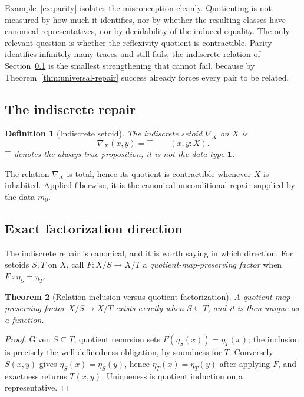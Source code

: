 \documentclass[10pt,reqno]{amsart}
\newtheorem{theorem}{Theorem}[section]
\newtheorem{definition}[theorem]{Definition}
\newcommand{\Unit}{\mathbf 1}
\begin{document}
Example~\ref{ex:parity} isolates the misconception cleanly.  Quotienting is not
measured by how much it identifies, nor by whether the resulting classes have
canonical representatives, nor by decidability of the induced equality.  The
only relevant question is whether the reflexivity quotient is contractible.
Parity identifies infinitely many traces and still fails; the indiscrete
relation of Section~\ref{subsec:indiscrete} is the smallest strengthening that
cannot fail, because by Theorem~\ref{thm:universal-repair} success already
forces every pair to be related.

\subsection{The indiscrete repair}
\label{subsec:indiscrete}

\begin{definition}[Indiscrete setoid]
\label{def:indiscrete}
The indiscrete setoid \(\nabla_X\) on \(X\) is
\[
                        \nabla_X(x,y)=\top
                        \qquad(x,y:X).
\tag{5.9}\label{eq:indiscrete}
\]
\(\top\) denotes the always-true proposition; it is not the data type \(\Unit\).
\end{definition}

The relation \(\nabla_X\) is total, hence its quotient is contractible whenever
\(X\) is inhabited.  Applied fiberwise, it is the canonical unconditional
repair supplied by the data \(m_0\).

\subsection{Exact factorization direction}

The indiscrete repair is canonical, and it is worth saying in which direction.
For setoids \(S,T\) on \(X\), call \(F:X/S\to X/T\) a
\emph{quotient-map-preserving factor} when \(F\circ\eta_S=\eta_T\).

\begin{theorem}[Relation inclusion versus quotient factorization]
\label{thm:factor-inclusion}
A quotient-map-preserving factor \(X/S\to X/T\) exists exactly when
\(S\subseteq T\), and it is then unique as a function.
\end{theorem}

\begin{proof}
Given \(S\subseteq T\), quotient recursion sets \(F(\eta_S(x))=\eta_T(x)\); the
inclusion is precisely the well-definedness obligation, by soundness for \(T\).
Conversely \(S(x,y)\) gives \(\eta_S(x)=\eta_S(y)\), hence
\(\eta_T(x)=\eta_T(y)\) after applying \(F\), and exactness returns \(T(x,y)\).
Uniqueness is quotient induction on a representative.
\end{proof}
\end{document}
